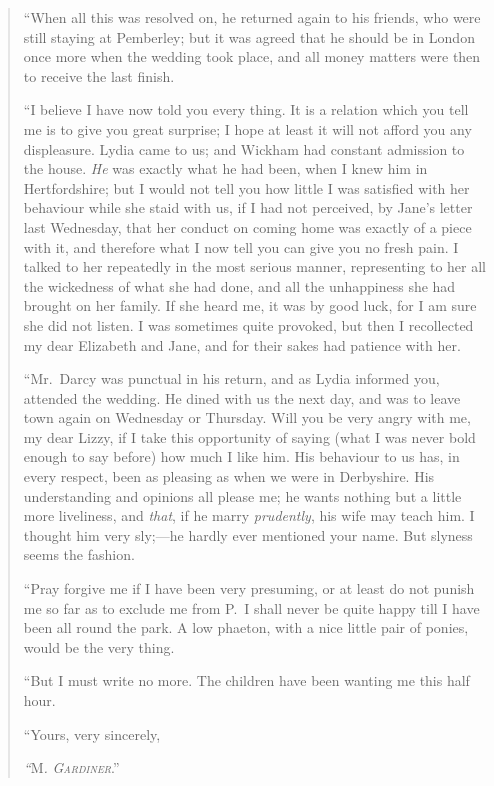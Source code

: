 \documentclass[12pt,english,oneside]{book}
\newcommand{\noun}[1]{\textsc{#1}}
\begin{document}
\begin{quotation}
{}``When all this was resolved on, he returned again to his friends,
who were still staying at Pemberley; but it was agreed that he should
be in London once more when the wedding took place, and all money
matters were then to receive the last finish.

{}``I believe I have now told you every thing. It is a relation which
you tell me is to give you great surprise; I hope at least it will
not afford you any displeasure. Lydia came to us; and Wickham had
constant admission to the house. \textit{He} was exactly what he had
been, when I knew him in Hertfordshire; but I would not tell you how
little I was satisfied with her behaviour while she staid with us,
if I had not perceived, by Jane's letter last Wednesday, that her
conduct on coming home was exactly of a piece with it, and therefore
what I now tell you can give you no fresh pain. I talked to her repeatedly
in the most serious manner, representing to her all the wickedness
of what she had done, and all the unhappiness she had brought on her
family. If she heard me, it was by good luck, for I am sure she did
not listen. I was sometimes quite provoked, but then I recollected
my dear Elizabeth and Jane, and for their sakes had patience with
her.

{}``Mr.\ Darcy was punctual in his return, and as Lydia informed
you, attended the wedding. He dined with us the next day, and was
to leave town again on Wednesday or Thursday. Will you be very angry
with me, my dear Lizzy, if I take this opportunity of saying (what
I was never bold enough to say before) how much I like him. His behaviour
to us has, in every respect, been as pleasing as when we were in Derbyshire.
His understanding and opinions all please me; he wants nothing but
a little more liveliness, and \textit{that}, if he marry \textit{prudently},
his wife may teach him. I thought him very sly;\mbox{---}he hardly
ever mentioned your name. But slyness seems the fashion.

{}``Pray forgive me if I have been very presuming, or at least do
not punish me so far as to exclude me from P.\  I shall never be
quite happy till I have been all round the park. A low phaeton, with
a nice little pair of ponies, would be the very thing.

{}``But I must write no more. The children have been wanting me this
half hour.

{}``Yours, very sincerely,

\emph{{}``}\noun{M}\emph{\noun{.}} \textit{\emph{\noun{Gardiner}}}.'' 
\end{quotation}
\end{document}
